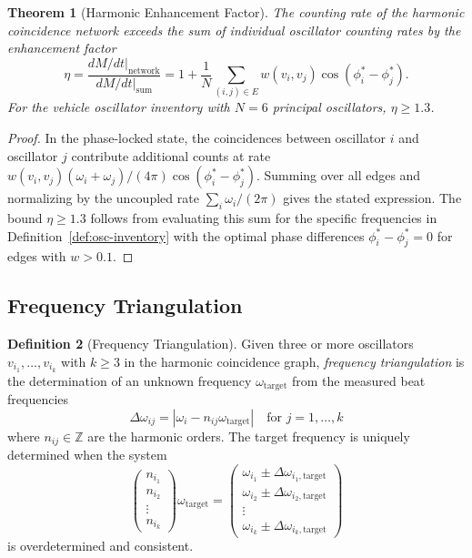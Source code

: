 \documentclass[twocolumn,10pt]{article}
\newtheorem{theorem}{Theorem}[section]
\theoremstyle{definition}
\newtheorem{definition}[theorem]{Definition}
\theoremstyle{remark}
\newcommand{\Z}{\mathbb{Z}}
\begin{document}
\begin{theorem}[Harmonic Enhancement Factor]\label{thm:enhancement}
The counting rate of the harmonic coincidence network exceeds the sum of
individual oscillator counting rates by the enhancement factor
\begin{equation}\label{eq:enhancement}
  \eta = \frac{dM/dt\big|_{\mathrm{network}}}{dM/dt\big|_{\mathrm{sum}}}
  = 1 + \frac{1}{N} \sum_{(i,j) \in E} w(v_i, v_j)
  \cos(\phi_i^* - \phi_j^*).
\end{equation}
For the vehicle oscillator inventory with $N = 6$ principal oscillators,
$\eta \geq 1.3$.
\end{theorem}

\begin{proof}
In the phase-locked state, the coincidences between oscillator $i$ and
oscillator $j$ contribute additional counts at rate $w(v_i, v_j)
(\omega_i + \omega_j)/(4\pi) \cos(\phi_i^* - \phi_j^*)$. Summing over
all edges and normalizing by the uncoupled rate $\sum_i \omega_i/(2\pi)$
gives the stated expression. The bound $\eta \geq 1.3$ follows from
evaluating this sum for the specific frequencies in
Definition~\ref{def:osc-inventory} with the optimal phase differences
$\phi_i^* - \phi_j^* = 0$ for edges with $w > 0.1$.
\end{proof}

\subsection{Frequency Triangulation}

\begin{definition}[Frequency Triangulation]\label{def:freq-triangulation}
Given three or more oscillators $v_{i_1}, \ldots, v_{i_k}$ with $k \geq 3$
in the harmonic coincidence graph, \emph{frequency triangulation} is the
determination of an unknown frequency $\omega_{\mathrm{target}}$ from the
measured beat frequencies
\begin{equation}\label{eq:beat-freq}
  \Delta \omega_{ij} = |\omega_{i} - n_{ij} \omega_{\mathrm{target}}|
  \quad \text{for } j = 1, \ldots, k
\end{equation}
where $n_{ij} \in \Z$ are the harmonic orders. The target frequency is
uniquely determined when the system
\begin{equation}
  \begin{pmatrix} n_{i_1} \\ n_{i_2} \\ \vdots \\ n_{i_k} \end{pmatrix}
  \omega_{\mathrm{target}} =
  \begin{pmatrix} \omega_{i_1} \pm \Delta\omega_{i_1,\mathrm{target}} \\
  \omega_{i_2} \pm \Delta\omega_{i_2,\mathrm{target}} \\
  \vdots \\
  \omega_{i_k} \pm \Delta\omega_{i_k,\mathrm{target}} \end{pmatrix}
\end{equation}
is overdetermined and consistent.
\end{definition}
\end{document}
